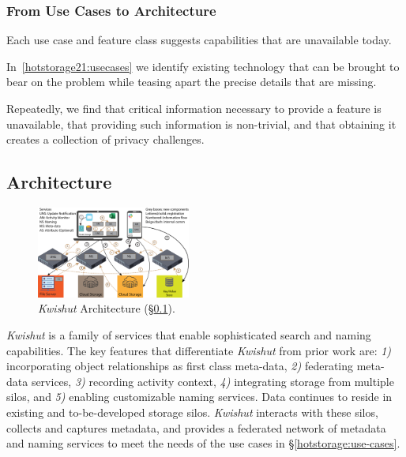 \subsubsection{From Use Cases to Architecture}

Each use case and feature class suggests capabilities that are unavailable
today.

In~\autoref{hotstorage21:usecases} we identify existing technology that can be brought to
bear on the problem while teasing apart the precise details that are missing.

Repeatedly, we find that critical information necessary to provide a feature is
unavailable, that providing such information is non-trivial, and that obtaining
it creates a collection of privacy challenges.

\subsection{Architecture}
\label{hotstorage21:arch}

\begin{figure}[!tb]
    \centering
    \includegraphics[width=0.45\textwidth]{reference/hotstorage21/figures/Naming5-legend.png}
    \caption{\emph{Kwishut} Architecture (\S \ref{hotstorage21:arch}).
    }
    \label{fig:arch}
\end{figure}


\emph{Kwishut} is a family of services that enable sophisticated search and naming capabilities.
The key features that differentiate \emph{Kwishut} from prior work are:
\textit{1)} incorporating object relationships as first class meta-data,
\textit{2)} federating meta-data services,
\textit{3)} recording activity context,
\textit{4)} integrating storage from multiple silos, and
\textit{5)} enabling customizable naming services.
Data continues to reside in existing and to-be-developed storage silos.
\emph{Kwishut} interacts with these silos, collects and captures metadata, and
provides a federated network of metadata and naming services to
meet the needs of the use cases in \S \ref{hotstorage:use-cases}.

